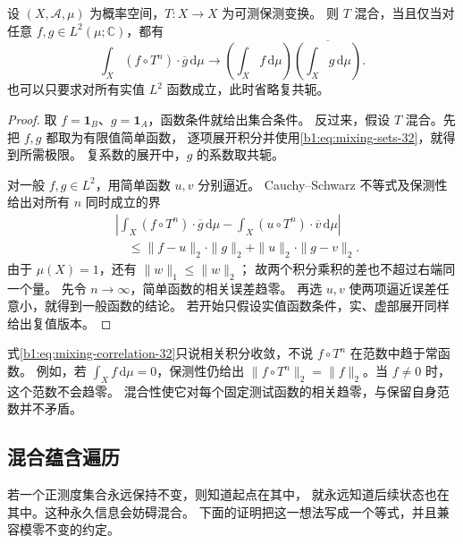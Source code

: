 \begin{proposition}[混合性的函数判别]
\label{b1:prop:mixing-correlations-32}
设 \((X,\mathcal A,\mu)\) 为概率空间，\(T:X\to X\) 为可测保测变换。
则 \(T\) 混合，当且仅当对任意 \(f,g\in L^2(\mu;\mathbb C)\)，都有
\begin{equation}
 \int_X(f\circ T^n)\cdot\overline g\,\mathrm d\mu
 \longrightarrow
 \left(\int_Xf\,\mathrm d\mu\right)
 \overline{\left(\int_Xg\,\mathrm d\mu\right)}.
 \label{b1:eq:mixing-correlation-32}
\end{equation}
也可以只要求对所有实值 \(L^2\) 函数成立，此时省略复共轭。
\end{proposition}
\begin{proof}
取 \(f=\mathbf1_B\)、\(g=\mathbf1_A\)，函数条件就给出集合条件。
反过来，假设 \(T\) 混合。先把 \(f,g\) 都取为有限值简单函数，
逐项展开积分并使用\eqref{b1:eq:mixing-sets-32}，就得到所需极限。
复系数的展开中，\(g\) 的系数取共轭。

对一般 \(f,g\in L^2\)，用简单函数 \(u,v\) 分别逼近。
Cauchy--Schwarz 不等式及保测性给出对所有 \(n\) 同时成立的界
\[
 \begin{aligned}
 &\left|\int_X(f\circ T^n)\cdot\overline g\,\mathrm d\mu
       -\int_X(u\circ T^n)\cdot\overline v\,\mathrm d\mu\right|\\
 &\hspace{1em}\leq
 \|f-u\|_2\cdot\|g\|_2+\|u\|_2\cdot\|g-v\|_2.
 \end{aligned}
\]
由于 \(\mu(X)=1\)，还有 \(\|w\|_1\leq\|w\|_2\)；
故两个积分乘积的差也不超过右端同一个量。
先令 \(n\to\infty\)，简单函数的相关误差趋零。
再选 \(u,v\) 使两项逼近误差任意小，就得到一般函数的结论。
若开始只假设实值函数条件，实、虚部展开同样给出复值版本。
\end{proof}

式\eqref{b1:eq:mixing-correlation-32}只说相关积分收敛，不说 \(f\circ T^n\) 在范数中趋于常函数。
例如，若 \(\int_Xf\,\mathrm d\mu=0\)，保测性仍给出
\(\|f\circ T^n\|_2=\|f\|_2\)。当 \(f\ne0\) 时，这个范数不会趋零。
混合性使它对每个固定测试函数的相关趋零，与保留自身范数并不矛盾。

\subsection{混合蕴含遍历}
\label{b1:subsec:320502}

若一个正测度集合永远保持不变，则知道起点在其中，
就永远知道后续状态也在其中。这种永久信息会妨碍混合。
下面的证明把这一想法写成一个等式，并且兼容模零不变的约定。

